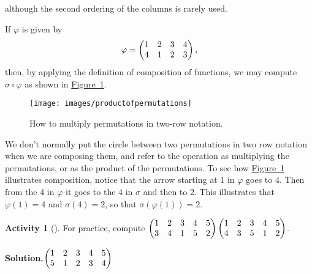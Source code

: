 \documentclass[10pt,]{book}
\theoremstyle{plain}
\theoremstyle{definition}
\newtheorem{activity}[project]{Activity}
\numberwithin{equation}{chapter}
\newcommand{\amp}{&}
\begin{document}
although the second ordering of the columns is rarely used.%
\par
If \(\varphi\) is given by%
\begin{equation*}
\varphi = \begin{pmatrix}1\amp 2\amp 3\amp 4\cr4\amp 1\amp 2\amp 3
\end{pmatrix} ,
\end{equation*}
then, by applying the definition of composition of functions, we may compute \(\sigma\circ
\varphi\) as shown in \hyperref[permutationproduct]{Figure~\ref{permutationproduct}}.%
\begin{figure}
\centering
\texttt{[image: images/productofpermutations]}
\caption{How to multiply permutations in two-row notation.\label{permutationproduct}}
\end{figure}
We don't normally put the circle between two permutations in two row notation when we are composing them, and refer to the operation as multiplying the permutations, or as the product of the permutations. To see how \hyperref[permutationproduct]{Figure~\ref{permutationproduct}} illustrates composition, notice that the arrow starting at 1 in \(\varphi\) goes to 4. Then from the 4 in \(\varphi\) it goes to the 4 in \(\sigma\) and then to 2. This illustrates that \(\varphi(1)=4\) and \(\sigma(4) =2\), so that \(\sigma(\varphi(1))=2\).%
\begin{activity}[]\label{activity-247}
For practice, compute \(\begin{pmatrix}1\amp 2\amp 3\amp 4\amp 5\cr3\amp 4\amp 1\amp 5\amp 2
\end{pmatrix}
\begin{pmatrix}1\amp 2\amp 3\amp 4\amp 5\cr 4\amp 3\amp 5\amp 1\amp 2
\end{pmatrix}\).%
\par\medskip\noindent%
\textbf{Solution.}\quad \(\begin{pmatrix}1\amp 2\amp 3\amp 4\amp 5\cr5\amp 1\amp 2\amp 3\amp 4
\end{pmatrix}\)%
\end{activity}
\typeout{************************************************}
\typeout{************************************************}
\end{document}
